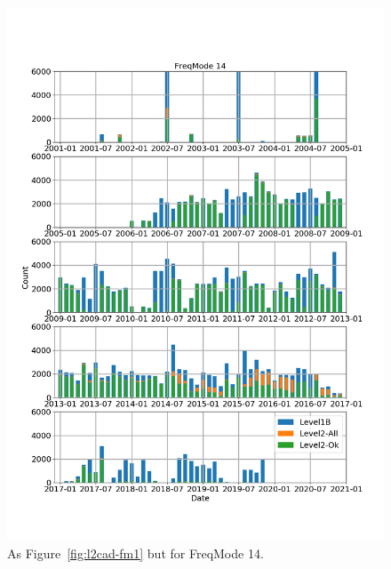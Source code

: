 \begin{figure}[t]
\centering
\includegraphics[width=1.0\textwidth]{l2cad-fm14.png}
\caption{As Figure~\ref{fig:l2cad-fm1} but for FreqMode 14.}
\label{fig:l2cad-fm14}
\end{figure}

